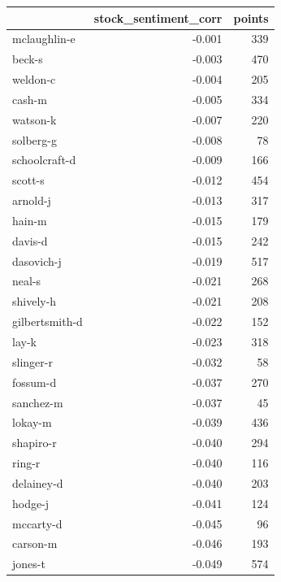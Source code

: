 \documentclass{vldb}
\begin{document}
\begin{appendix}
\clearpage
\begin{supertabular}{ l r r }
\toprule
{} &  stock\_sentiment\_corr &  points \\
\midrule
mclaughlin-e   &                -0.001 &     339 \\
beck-s         &                -0.003 &     470 \\
weldon-c       &                -0.004 &     205 \\
cash-m         &                -0.005 &     334 \\
watson-k       &                -0.007 &     220 \\
solberg-g      &                -0.008 &      78 \\
schoolcraft-d  &                -0.009 &     166 \\
scott-s        &                -0.012 &     454 \\
arnold-j       &                -0.013 &     317 \\
hain-m         &                -0.015 &     179 \\
davis-d        &                -0.015 &     242 \\
dasovich-j     &                -0.019 &     517 \\
neal-s         &                -0.021 &     268 \\
shively-h      &                -0.021 &     208 \\
gilbertsmith-d &                -0.022 &     152 \\
lay-k          &                -0.023 &     318 \\
slinger-r      &                -0.032 &      58 \\
fossum-d       &                -0.037 &     270 \\
sanchez-m      &                -0.037 &      45 \\
lokay-m        &                -0.039 &     436 \\
shapiro-r      &                -0.040 &     294 \\
ring-r         &                -0.040 &     116 \\
delainey-d     &                -0.040 &     203 \\
hodge-j        &                -0.041 &     124 \\
mccarty-d      &                -0.045 &      96 \\
carson-m       &                -0.046 &     193 \\
jones-t        &                -0.049 &     574 \\

\end{supertabular}
\end{appendix}
\end{document}
